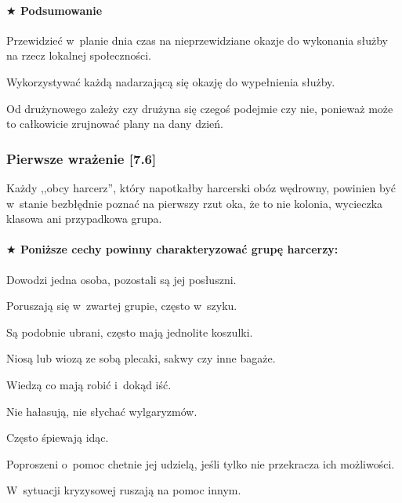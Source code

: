 \documentclass[a5paper,10pt,titlepage,twoside]{article}
\newcommand*{\thecheckbox}{\hss$\Box$} %
\newenvironment*{checklist}
{\list{}{%
\renewcommand*{\makelabel}[1]{\thecheckbox}}}
{\endlist}
\begin{document}
\paragraph{$\bigstar$ Podsumowanie}
\begin{checklist}
\item Przewidzieć w~planie dnia czas na nieprzewidziane okazje do wykonania służby na rzecz lokalnej społeczności.
\item Wykorzystywać każdą nadarzającą się okazję do wypełnienia służby.
\item Od drużynowego zależy czy drużyna się czegoś podejmie czy nie, ponieważ może to całkowicie zrujnować plany na dany dzień.
\end{checklist}
\subsubsection{Pierwsze wrażenie [7.6]}
Każdy ,,obcy harcerz'', który napotkałby harcerski obóz wędrowny, powinien być w~stanie bezbłędnie poznać na pierwszy rzut oka, że to nie kolonia, wycieczka klasowa ani przypadkowa grupa.
\paragraph{$\bigstar$ Poniższe cechy powinny charakteryzować grupę harcerzy:} %
\begin{checklist}
\item Dowodzi jedna osoba, pozostali są jej posłuszni.
\item Poruszają się w~zwartej grupie, często w~szyku.
\item Są podobnie ubrani, często mają jednolite koszulki.
\item Niosą lub wiozą ze sobą plecaki, sakwy czy inne bagaże.
\item Wiedzą co mają robić i~dokąd iść.
\item Nie hałasują, nie słychać wylgaryzmów.
\item Często śpiewają idąc.
\item Poproszeni o~pomoc chetnie jej udzielą, jeśli tylko nie przekracza ich możliwości.
\item W~sytuacji kryzysowej ruszają na pomoc innym.
\end{checklist}
\end{document}

